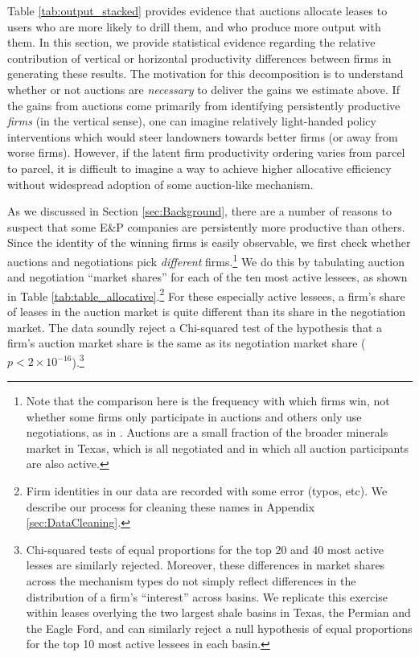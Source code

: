 \documentclass[12pt]{article}
\begin{document}
Table \ref{tab:output_stacked} provides evidence that auctions allocate leases to users who are more likely to drill them, and who produce more output with them. In this section, we provide statistical evidence regarding the relative contribution of vertical or horizontal productivity differences between firms in generating these results. The motivation for this decomposition is to understand whether or not auctions are \textit{necessary} to deliver the gains we estimate above. If the gains from auctions come primarily from identifying persistently productive \textit{firms} (in the vertical sense), one can imagine relatively light-handed policy interventions which would steer landowners towards better firms (or away from worse firms). However, if the latent firm productivity ordering varies from parcel to parcel, it is difficult to imagine a way to achieve higher allocative efficiency without widespread adoption of some auction-like mechanism. 

As we discussed in Section \ref{sec:Background}, there are a number of reasons to suspect that some E\&P companies are persistently more productive than others. Since the identity of the winning firms is easily observable, we first check whether auctions and negotiations pick \emph{different} firms.\footnote{Note that the comparison here is the frequency with which firms win, not whether some firms only participate in auctions and others only use negotiations, as in \cite{bajari_auctions_2009}. Auctions are a small fraction of the broader minerals market in Texas, which is all negotiated and in which all auction participants are also active.} We do this by tabulating auction and negotiation ``market shares'' for each of the ten most active lessees, as shown in Table \ref{tab:table_allocative}.\footnote{Firm identities in our data are recorded with some error (typos, etc). We describe our process for cleaning these names in Appendix \ref{sec:DataCleaning}.}  For these especially active lessees, a firm's share of leases in the auction market is quite different than its share in the negotiation market.  The data soundly reject a Chi-squared test of the hypothesis that a firm's auction market share is the same as its negotiation market share  ($p<2\times 10^{-16}$).\footnote{Chi-squared tests of equal proportions for the top 20 and 40 most active lesses are similarly rejected.  Moreover, these differences in market shares across the mechanism types do not simply reflect differences in the distribution of a firm's ``interest'' across basins. We replicate this exercise within leases overlying the two largest shale basins in Texas, the Permian and the Eagle Ford, and can similarly reject a null hypothesis of equal proportions for the top 10 most active lessees in each basin.}  
\end{document}
